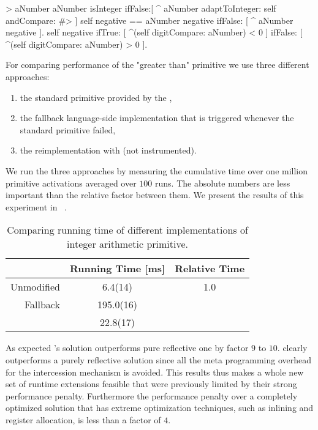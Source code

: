 \begin{stcode}{1}
> aNumber
	aNumber isInteger 
		ifFalse:[
			^ aNumber 
				adaptToInteger: self andCompare: #> ]
	self negative == aNumber negative
		ifFalse: [ ^ aNumber negative ].
	self negative
		ifTrue: [ ^(self digitCompare: aNumber) < 0 ]
		ifFalse: [ ^(self digitCompare: aNumber) > 0 ].
\end{stcode}


\noindent For comparing performance of the "greater than" primitive we use three different approaches:
%
\begin{enumerate}
	\item the standard primitive provided by the \VM,
	\item the fallback language-side implementation that is triggered whenever the standard primitive failed,
	\item the reimplementation with \WF (not instrumented).
\end{enumerate}
%
We run the three approaches by measuring the cumulative time over one million primitive activations averaged over $100$ runs.
The absolute numbers are less important than the relative factor between them.
We present the results of this experiment in ~.
%
\begin{table}[H]
    \centering
    \begin{tabular}{rSS}
					& {Running Time [ms]} & {Relative Time} \\\midrule
		Unmodified	&   6.4(14)           & 1.0\\
		Fallback	& 195.0(16)           &  \\
		\WF	        &  22.8(17)           & 
    \end{tabular}
    \caption[\WF Speed Comparison: Large Integer]{Comparing running time of different implementations of integer arithmetic primitive.}
\end{table}

\noindent As expected \WF's solution outperforms pure reflective one by factor $9$ to $10$.
\WF clearly outperforms a purely reflective solution since all the meta programming overhead for the intercession mechanism is avoided.
This results thus makes a whole new set of runtime extensions feasible that were previously limited by their strong performance penalty.
Furthermore the performance penalty over a completely optimized \VM solution that has extreme optimization techniques, such as inlining and register allocation, is less than a factor of $4$.

